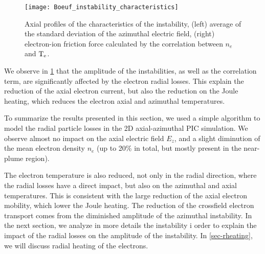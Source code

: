     \begin{figure}[!hbt]
      \centering
      \texttt{[image: Boeuf\_instability\_characteristics]}
      \caption{Axial profiles of the characteristics of the instability, (left) average of the standard deviation of the azimuthal electric field, (right) electron-ion friction force calculated by the correlation between $n_e$ and $\mathrm{T_e}$.    }
      \label{fig-boeuf-instability}
    \end{figure}

    
    We observe in \cref{fig-boeuf-instability} that the amplitude of the instabilities, as well as the correlation term, are significantly affected by the electron radial losses.
    This explain the reduction of the axial electron current, but also the reduction on the Joule heating, which reduces the electron axial and azimuthal temperatures.

    \vspace{1em}
    To summarize the results presented in this section, we used a simple algorithm to model the radial particle losses in the \ac{2D} axial-azimuthal \ac{PIC} simulation.
    We observe almost no impact on the axial electric field $E_z$, and a slight diminution of the mean electron density $n_e$ (up to 20\% in total, but mostly present in the near-plume region).
    
    The electron temperature is also reduced, not only in the radial direction, where the radial losses have a direct impact, but also on the azimuthal and axial temperatures.
    This is consistent with the large reduction of the axial electron mobility, which lower the Joule heating.
    The reduction of the crossfield electron transport comes from the diminished amplitude of the azimuthal instability.
    In the next section, we analyze in more details the instability i order to explain the impact of the radial losses on the amplitude of the instability.
    In \cref{sec-rheating}, we will discuss radial heating of the electrons.


\afterpage{\clearpage}
